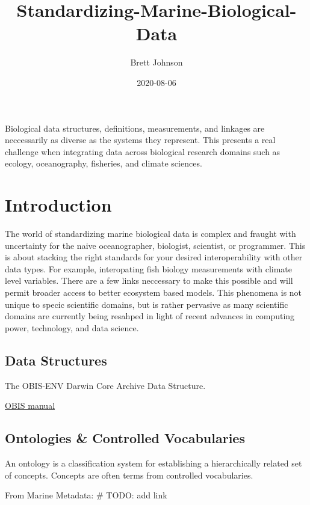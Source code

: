 \documentclass[]{book}
\title{Standardizing-Marine-Biological-Data}
\author{Brett Johnson}
\date{2020-08-06}
\begin{document}
\maketitle

{
\setcounter{tocdepth}{1}
\tableofcontents
}
Biological data structures, definitions, measurements, and linkages are neccessarily as diverse as the systems they represent. This presents a real challenge when integrating data across biological research domains such as ecology, oceanography, fisheries, and climate sciences.

\hypertarget{intro}{%
\chapter{Introduction}\label{intro}}

The world of standardizing marine biological data is complex and fraught with uncertainty for the naive oceanographer, biologist, scientist, or programmer. This is about stacking the right standards for your desired interoperability with other data types. For example, interopating fish biology measurements with climate level variables. There are a few links neccessary to make this possible and will permit broader access to better ecosystem based models. This phenomena is not unique to specic scientific domains, but is rather pervasive as many scientific domains are currently being resahped in light of recent advances in computing power, technology, and data science.

\hypertarget{data-structures}{%
\section{Data Structures}\label{data-structures}}

The OBIS-ENV Darwin Core Archive Data Structure.

\href{\%22https://obis.org/manual/\%22}{OBIS manual}

\hypertarget{ontologies-controlled-vocabularies}{%
\section{Ontologies \& Controlled Vocabularies}\label{ontologies-controlled-vocabularies}}

An ontology is a classification system for establishing a hierarchically related set of concepts. Concepts are often terms from controlled vocabularies.

From Marine Metadata: \# TODO: add link
\end{document}
